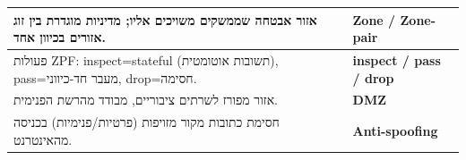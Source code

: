\documentclass[11pt]{article}
\newcommand{\enLR}[1]{\textenglish{#1}}
\begin{document}
\begin{xltabular}{\linewidth}{|>{\setRTL\raggedleft\arraybackslash}X|>{\setRTL\raggedleft\arraybackslash}X|}
\hline
אזור אבטחה שממשקים משויכים אליו; מדיניות מוגדרת בין זוג אזורים בכיוון אחד. & \textbf{\enLR{Zone / Zone-pair}} \\
\hline
פעולות \enLR{ZPF: inspect=stateful} (תשובות אוטומטית), \enLR{pass}=מעבר חד-כיווני, \enLR{drop}=חסימה. & \textbf{\enLR{inspect / pass / drop}} \\
\hline
אזור מפורז לשרתים ציבוריים, מבודד מהרשת הפנימית. & \textbf{\enLR{DMZ}} \\
\hline
חסימת כתובות מקור מזויפות (פרטיות/פנימיות) בכניסה מהאינטרנט. & \textbf{\enLR{Anti-spoofing}} \\
\hline
\end{xltabular}
\end{document}
